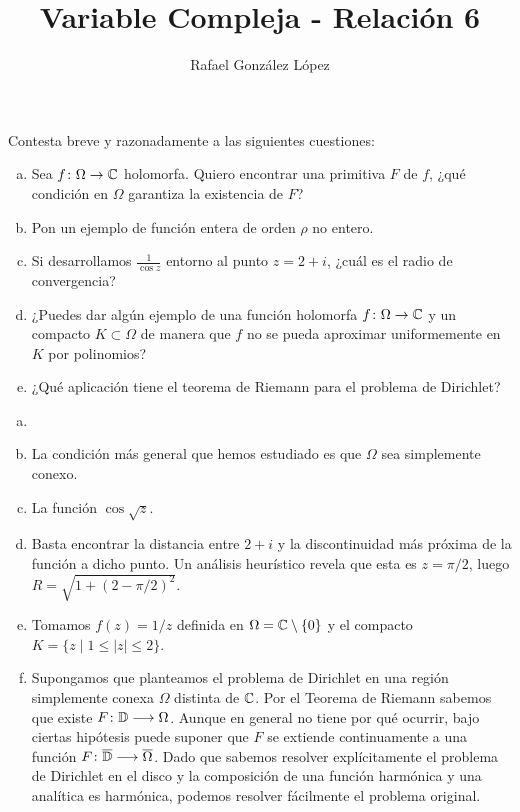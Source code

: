 \documentclass[twoside]{article}
\begin{document}
\title{Variable Compleja - Relación 6}
\author{Rafael González López}
\maketitle


\begin{ejercicio}{1}
Contesta breve y razonadamente a las siguientes cuestiones:
\begin{enumerate}[a)]
\item Sea $f\colon\Omega\to \mathbb{C}$ holomorfa. Quiero encontrar una primitiva $F$ de $f$, ¿qué condición en $\Omega$ garantiza la existencia de $F$?
\item Pon un ejemplo de función entera  de orden $\rho$ no entero. 
\item Si desarrollamos $\frac{1}{\cos z}$ entorno al punto $z=2+i$, ¿cuál es el radio de convergencia?
\item ¿Puedes dar algún ejemplo de una función holomorfa $f\colon\Omega\to\mathbb{C}$ y un compacto 
$K\subset\Omega$ de manera que $f$ no se pueda aproximar uniformemente en $K$ por polinomios?
\item ¿Qué aplicación tiene el teorema de Riemann para el problema de Dirichlet?
\end{enumerate}
\end{ejercicio}
\begin{solucion}
\begin{enumerate}[a)]
\item[]
\item La condición más general que hemos estudiado es que $\Omega$ sea simplemente conexo.
\item La función $\cos \sqrt{z}$.
\item Basta encontrar la distancia entre $2+i$ y la discontinuidad más próxima de la función a dicho punto. Un análisis heurístico revela que esta es $z=\pi/2$, luego $R=\sqrt{1 + (2 - \pi/2)^2}$.
\item Tomamos $f(z)=1/z$ definida en $\Omega = \mathbb{C}\setminus\{0\}$ y el compacto $K=\{z\mid 1\leq |z|\leq 2\}$.
\item Supongamos que planteamos el problema de Dirichlet en una región simplemente conexa $\Omega$ distinta de $\mathbb{C}$. Por el Teorema de Riemann sabemos que existe $F\colon{ \mathbb{D}}\longrightarrow{\Omega}$. Aunque en general no tiene por qué ocurrir, bajo ciertas hipótesis puede suponer que $F$ se extiende continuamente a una función $F\colon{\overline{\mathbb{D}}}\longrightarrow{\overline{\Omega}}$. Dado que sabemos resolver explícitamente el problema de Dirichlet en el disco y la composición de una función harmónica y una analítica es harmónica, podemos resolver fácilmente el problema original.
\end{enumerate}
\end{solucion}
\end{document}
